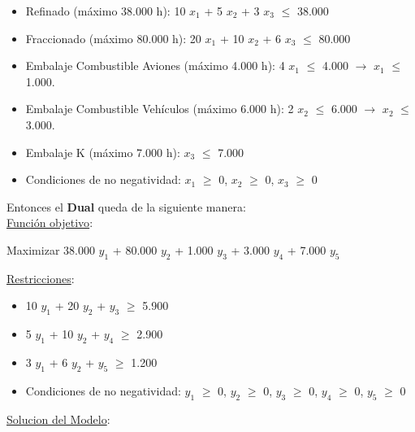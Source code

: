 \documentclass[10pt,a4paper]{article}
\begin{document}
\begin{enumerate}
\begin{itemize}
        \item Refinado (máximo 38.000 h): 10 $x_{1}$ + 5 $x_{2}$ + 3 $x_{3}$ $\leq$ 38.000
        \item Fraccionado (máximo 80.000 h): 20 $x_{1}$ + 10 $x_{2}$ + 6 $x_{3}$ $\leq$ 80.000
        \item Embalaje Combustible Aviones (máximo 4.000 h): 4 $x_{1}$ $\leq$ 4.000 $\rightarrow$ $x_{1}$ $\leq$ 1.000.
        \item Embalaje Combustible Vehículos (máximo 6.000 h): 2 $x_{2}$ $\leq$ 6.000 $\rightarrow$ $x_{2}$ $\leq$ 3.000.
        \item Embalaje K (máximo 7.000 h): $x_{3}$ $\leq$ 7.000
        \item Condiciones de no negatividad: $x_{1}$ $\geq$ 0, $x_{2}$ $\geq$ 0, $x_{3}$ $\geq$ 0\\

    \end{itemize}

    \vspace{0.5em}

    Entonces el \textbf{Dual} queda de la siguiente manera: \\

    \underline{Función objetivo}: 

    \begin{center}
        
        Maximizar 38.000 $y_{1}$ + 80.000 $y_{2}$ + 1.000 $y_{3}$ + 3.000 $y_{4}$ + 7.000 $y_{5}$

    \end{center}

    \underline{Restricciones}: 

    \begin{itemize}

        \item 10 $y_{1}$ + 20 $y_{2}$ + $y_{3}$ $\geq$ 5.900
        \item 5 $y_{1}$ + 10 $y_{2}$ + $y_{4}$ $\geq$ 2.900
        \item 3 $y_{1}$ + 6 $y_{2}$ + $y_{5}$ $\geq$ 1.200
        \item Condiciones de no negatividad: $y_{1}$ $\geq$ 0, $y_{2}$ $\geq$ 0, $y_{3}$ $\geq$ 0, $y_{4}$ $\geq$ 0, $y_{5}$ $\geq$ 0\\

    \end{itemize}

    \underline{Solucion del Modelo}: 

    \begin{itemize}


\end{itemize}
\end{enumerate}
\end{document}
